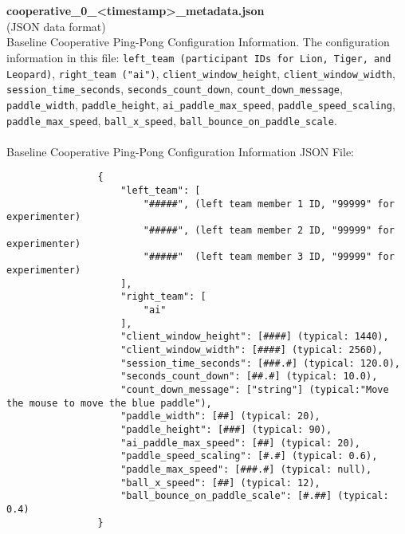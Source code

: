 \begin{description}
\begin{addmargin}[0em]{0em}
        \textbf{\\\\}
        \begin{addmargin}[1em]{0em} %
            \textbf{cooperative\_0\_<timestamp>\_metadata.json}\\(JSON data format)\\
            Baseline Cooperative Ping-Pong Configuration Information. The configuration
            information in this file: \verb|left_team (participant IDs for Lion, Tiger, and Leopard)|, \verb|right_team ("ai")|,
            \verb|client_window_height|, \verb|client_window_width|, \verb|session_time_seconds|,
            \verb|seconds_count_down|, \verb|count_down_message|, \verb|paddle_width|, \verb|paddle_height|,
            \verb|ai_paddle_max_speed|, \verb|paddle_speed_scaling|, \verb|paddle_max_speed|, \verb|ball_x_speed|,
            \verb|ball_bounce_on_paddle_scale|.\\\\
            Baseline Cooperative Ping-Pong Configuration Information JSON File:
            \begin{verbatim}
                {
                    "left_team": [
                        "#####", (left team member 1 ID, "99999" for experimenter)
                        "#####", (left team member 2 ID, "99999" for experimenter)
                        "#####"  (left team member 3 ID, "99999" for experimenter)
                    ],
                    "right_team": [
                        "ai"
                    ],
                    "client_window_height": [####] (typical: 1440),
                    "client_window_width": [####] (typical: 2560),
                    "session_time_seconds": [###.#] (typical: 120.0),
                    "seconds_count_down": [##.#] (typical: 10.0),
                    "count_down_message": ["string"] (typical:"Move the mouse to move the blue paddle"),
                    "paddle_width": [##] (typical: 20),
                    "paddle_height": [###] (typical: 90),
                    "ai_paddle_max_speed": [##] (typical: 20),
                    "paddle_speed_scaling": [#.#] (typical: 0.6),
                    "paddle_max_speed": [###.#] (typical: null),
                    "ball_x_speed": [##] (typical: 12),
                    "ball_bounce_on_paddle_scale": [#.##] (typical: 0.4)
                }
            \end{verbatim}
        \end{addmargin} %


\end{addmargin}
\end{description}
